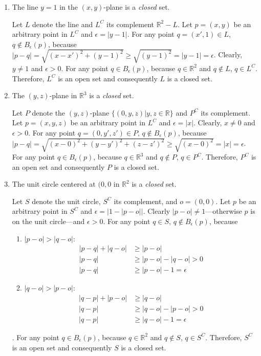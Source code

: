 \documentclass{homework}
\begin{document}
\begin{problem}{5}
\begin{enumerate}
\item The line $y = 1$ in the $(x, y)$-plane is a \emph{closed} set.

Let $L$ denote the line and $L^C$ its complement $\mathbb{R}^2 - L$. Let $p = (x, y)$ be an arbitrary point in $L^C$ and $\epsilon = |y - 1|$. For any point $q = (x', 1) \in L$, $q \notin B_{\epsilon}(p)$, because $|p - q| = \sqrt{(x - x')^2 + (y - 1)^2} \geq \sqrt{(y - 1)^2} = |y - 1| = \epsilon$. Clearly, $y \neq 1$ and $\epsilon > 0$. For any point $q \in B_{\epsilon}(p)$, because $q \in \mathbb{R}^2$ and $q \notin L$, $q \in L^C$. Therefore, $L^C$ is an open set and consequently $L$ is a closed set. \QED

\item The $(y, z)$-plane in $\mathbb{R}^3$ is a \emph{closed} set.

Let $P$ denote the $(y, z)$-plane $\{(0, y, z) | y, z \in \mathbb{R}\}$ and $P^C$ its complement. Let $p = (x, y, z)$ be an arbitrary point in $L^C$ and $\epsilon = |x|$. Clearly, $x \neq 0$ and $\epsilon > 0$. For any point $q = (0, y', z') \in P$, $q \notin B_{\epsilon}(p)$, because $|p - q| = \sqrt{(x - 0)^2 + (y - y')^2 + (z - z')^2} \geq \sqrt{(x - 0)^2} = |x| = \epsilon$. For any point $q \in B_{\epsilon}(p)$, because $q \in \mathbb{R}^3$ and $q \notin P$, $q \in P^C$. Therefore, $P^C$ is an open set and consequently $P$ is a closed set. \QED

\item The unit circle centered at $(0, 0$ in $\mathbb{R}^2$ is a \emph{closed} set.

Let $S$ denote the unit circle, $S^C$ its complement, and $o = (0, 0)$. Let $p$ be an arbitrary point in $S^C$ and $\epsilon = |1 - |p - o||$. Clearly $|p - o| \neq 1$---otherwise $p$ is on the unit circle---and $\epsilon > 0$. For any point $q \in S$, $q \notin B_{\epsilon}(p)$, because
\begin{enumerate}
\item $|p - o| > |q - o|$:
\begin{align*}
  |p - q| + |q - o| & \geq |p - o| \\
  |p - q| & \geq |p - o| - |q - o| > 0 \\
  |p - q| & \geq |p - o| - 1 = \epsilon
\end{align*}

\item $|q - o| > |p - o|$:
\begin{align*}
  |q - p| + |p - o| & \geq |q - o| \\
  |q - p| & \geq |q - o| - |p - o| > 0 \\
  |q - p| & \geq |q - o| - 1 = \epsilon
\end{align*}
\end{enumerate}
. For any point $q \in B_{\epsilon}(p)$, because $q \in \mathbb{R}^2$ and $q \notin S$, $q \in S^C$. Therefore, $S^C$ is an open set and consequently $S$ is a closed set. \QED


\end{enumerate}
\end{problem}
\end{document}
